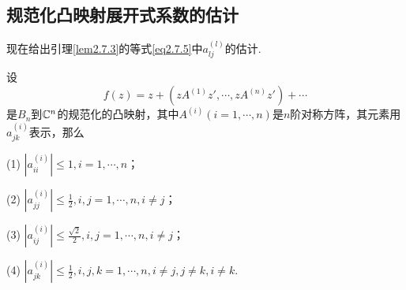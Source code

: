 \subsection{规范化凸映射展开式系数的估计}
现在给出引理\ref{lem2.7.3}的等式\eqref{eq2.7.5}中$a_{lj}^{(l)}$的估计.
\begin{lemma}\label{lem2.7.4}
	设
	\[f(z)=z+(zA^{(1)}z',\cdots,zA^{(n)}z')+\cdots\]
	是$B_n$到$\mathbb C^n$的规范化的凸映射，其中$A^{(i)}(i=1,\cdots,n)$是$n$阶对称方阵，其元素用$a_{jk}^{(i)}$表示，那么
	
	(1)\hypertarget{2.7.4}{} $|a_{ii}^{(i)}|\le1,i=1,\cdots,n$；
	
	(2)\hypertarget{2.7.4}{}	$|a_{jj}^{(i)}|\le\frac12,i,j=1,\cdots,n,i\neq j$；
	
	(3)\hypertarget{2.7.4}{} $|a_{ij}^{(i)}|\le\frac{\sqrt{2}}{2},i,j=1,\cdots,n,i\neq j$；
	
	(4)\hypertarget{2.7.4}{} $|a_{jk}^{(i)}|\le\frac12,i,j,k=1,\cdots,n,i\neq j,j\neq k,i\neq k$.
\end{lemma}

